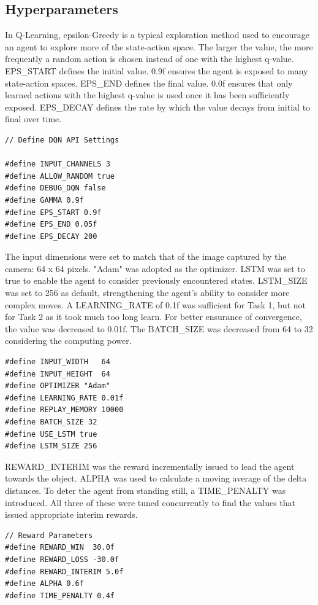 \documentclass[10pt,journal,compsoc]{IEEEtran}
\begin{document}
\subsection{Hyperparameters}

In Q-Learning, epsilon-Greedy is a typical exploration method used to encourage an agent to explore more of the state-action space. The larger the value, the more frequently a random action is chosen instead of one with the highest q-value. EPS\_START defines the initial value. 0.9f ensures the agent is exposed to many state-action spaces. EPS\_END defines the final value. 0.0f ensures that only learned actions with the highest q-value is used once it has been sufficiently exposed. EPS\_DECAY defines the rate by which the value decays from initial to final over time. 

\begin{lstlisting}
// Define DQN API Settings

#define INPUT_CHANNELS 3
#define ALLOW_RANDOM true
#define DEBUG_DQN false
#define GAMMA 0.9f
#define EPS_START 0.9f
#define EPS_END 0.05f
#define EPS_DECAY 200
\end{lstlisting}

The input dimensions were set to match that of the image captured by the camera: 64 x 64 pixels. "Adam" was adopted as the optimizer. LSTM was set to true to enable the agent to consider previously encountered states. LSTM\_SIZE was set to 256 as default, strengthening the agent's ability to consider more complex moves. A LEARNING\_RATE of 0.1f was sufficient for Task 1, but not for Task 2 as it took much too long learn. For better ensurance of convergence, the value was decreased to 0.01f. The BATCH\_SIZE was decreased from 64 to 32 considering the computing power.

\begin{lstlisting}
#define INPUT_WIDTH   64
#define INPUT_HEIGHT  64
#define OPTIMIZER "Adam"
#define LEARNING_RATE 0.01f
#define REPLAY_MEMORY 10000
#define BATCH_SIZE 32
#define USE_LSTM true
#define LSTM_SIZE 256
\end{lstlisting}

REWARD\_INTERIM was the reward incrementally issued to lead the agent towards the object. ALPHA was used to calculate a moving average of the delta distances. To deter the agent from standing still, a TIME\_PENALTY was introduced. All three of these were tuned concurrently to find the values that issued appropriate interim rewards.

\begin{lstlisting}
// Reward Parameters
#define REWARD_WIN  30.0f
#define REWARD_LOSS -30.0f
#define REWARD_INTERIM 5.0f
#define ALPHA 0.6f
#define TIME_PENALTY 0.4f
\end{lstlisting}
\end{document}
